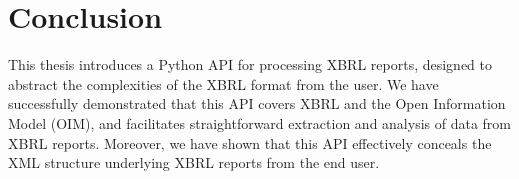 \chapter{Conclusion}
\label{chapter:conclusion}

This thesis introduces a Python API for processing XBRL reports, designed to abstract the complexities of the XBRL format from the user.
We have successfully demonstrated that this API covers XBRL and the Open Information Model (OIM),
and facilitates straightforward extraction and analysis of data from XBRL reports.
Moreover, we have shown that this API effectively conceals the XML structure underlying XBRL reports from the end user.



